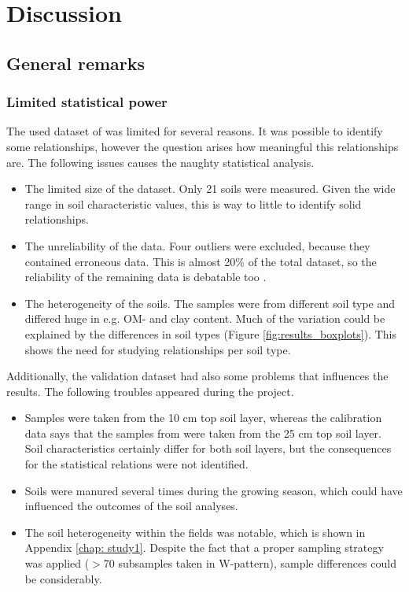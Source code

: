 \documentclass[10pt,twoside,dutch,english]{report}
\begin{document}
	
	
	


\chapter{Discussion}
   \section{General remarks}
   \subsection{Limited statistical power}
   The used dataset of \citet{Echeverri2014} was limited for several reasons. It was possible to identify some relationships, however the question arises how meaningful this relationships are. The following issues causes the naughty statistical analysis. 
		   \begin{itemize}
   	\item The limited size of the dataset. Only 21 soils were measured.  Given the wide range in soil characteristic values, this is way to little to identify solid relationships.
   	\item The unreliability of the data. Four outliers were excluded, because they contained erroneous data. This is almost 20\% of the total dataset, so
   	 the reliability of the remaining data is debatable too . 
   	\item The heterogeneity of the soils. The samples were from different soil type and differed huge in e.g. OM- and clay content. Much of the variation could be explained by the differences in soil types (Figure \ref{fig:results_boxplots}). This shows the need for studying relationships per soil type. 
    \end{itemize} 
   
   Additionally, the validation dataset had also some problems that influences the results. The following troubles appeared during the project.
		   \begin{itemize}
	\item Samples were taken from the 10 cm top soil layer, whereas the calibration data says that the samples from \citet{Echeverri2014} were taken from the 25 cm top soil layer. Soil characteristics certainly differ for both soil layers, but the consequences for the statistical relations were not identified. 
   	\item Soils were manured several times during the growing season, which could have influenced the outcomes of the soil analyses. 
   	\item The soil heterogeneity within the fields was notable, which is shown in Appendix \ref{chap: study1}. Despite the fact that a proper sampling strategy was applied ($>$70 subsamples taken in W-pattern), sample differences could be considerably. 
   \end{itemize}
   
\end{document}
